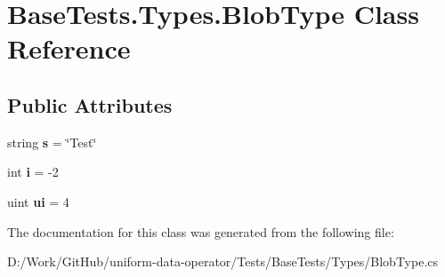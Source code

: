 \hypertarget{class_base_tests_1_1_types_1_1_blob_type}{}\section{Base\+Tests.\+Types.\+Blob\+Type Class Reference}
\label{class_base_tests_1_1_types_1_1_blob_type}
\subsection*{Public Attributes}
\begin{DoxyCompactItemize}
\item 
\mbox{\label{class_base_tests_1_1_types_1_1_blob_type_a3c06188698a50aeb4b1f91d330b252a3}} 
string {\bfseries s} = \char`\"{}Test\char`\"{}
\item 
\mbox{\label{class_base_tests_1_1_types_1_1_blob_type_a4abad716178d46f3141cff38ad3cec8a}} 
int {\bfseries i} = -\/2
\item 
\mbox{\label{class_base_tests_1_1_types_1_1_blob_type_a8d21732eca92e641ec3507406b955bf0}} 
uint {\bfseries ui} = 4
\end{DoxyCompactItemize}


The documentation for this class was generated from the following file\+:\begin{DoxyCompactItemize}
\item 
D\+:/\+Work/\+Git\+Hub/uniform-\/data-\/operator/\+Tests/\+Base\+Tests/\+Types/Blob\+Type.\+cs\end{DoxyCompactItemize}
